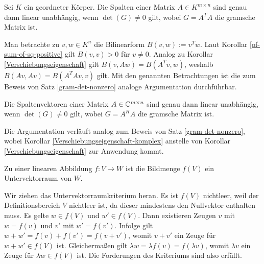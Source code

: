 \begin{Satz}
Sei $K$ ein geordneter Körper. Die Spalten einer Matrix
$A\in K^{m\times n}$ sind genau dann linear unabhängig, wenn
$\det(G)\ne 0$ gilt, wobei $G=A^T A$ die gramsche Matrix ist.
\end{Satz}
\begin{Beweis}
Man betrachte zu $v,w\in K^n$ die Bilinearform $B(v,w):=v^T w$.
Laut Korollar \ref{of-sum-of-sq-positive} gilt $B(v,v)>0$ für
$v\ne 0$. Analog zu Korollar \ref{Verschiebungseigenschaft} gilt
$B(v,Aw) = B(A^T v,w)$, weshalb $B(Av,Av) = B(A^T A v,v)$  gilt.
Mit den genannten Betrachtungen ist die zum Beweis von Satz
\ref{gram-det-nonzero} analoge Argumentation
durchführbar.\,\qedsymbol
\end{Beweis}

\begin{Satz}
Die Spaltenvektoren einer Matrix $A\in\mathbb C^{m\times n}$ sind
genau dann linear unabhängig, wenn $\det(G)\ne 0$ gilt, wobei
$G=A^H A$ die gramsche Matrix ist.
\end{Satz}
\begin{Beweis}
Die Argumentation verläuft analog zum Beweis von Satz
\ref{gram-det-nonzero}, wobei Korollar
\ref{Verschiebungseigenschaft-komplex} anstelle von
Korollar \ref{Verschiebungseigenschaft} zur Anwendung kommt.\,\qedsymbol
\end{Beweis}

\begin{Korollar}
Zu einer linearen Abbildung $f\colon V\to W$ ist die Bildmenge $f(V)$
ein Untervektorraum von $W$.
\end{Korollar}
\begin{Beweis}
Wir ziehen das Untervektorraumkriterium heran. Es ist $f(V)$ nichtleer,
weil der Definitionsbereich $V$ nichtleer ist, da dieser mindestens
den Nullvektor enthalten muss. Es gelte $w\in f(V)$ und $w'\in f(V)$.
Dann existieren Zeugen $v$ mit $w=f(v)$ und $v'$ mit $w'=f(v')$.
Infolge gilt $w+w' = f(v)+f(v') = f(v+v')$, womit $v+v'$ ein
Zeuge für $w+w'\in f(V)$ ist. Gleichermaßen gilt $\lambda w = \lambda f(v)
= f(\lambda v)$, womit $\lambda v$ ein Zeuge für $\lambda w\in f(V)$
ist. Die Forderungen des Kriteriums sind also erfüllt.\,\qedsymbol
\end{Beweis}

